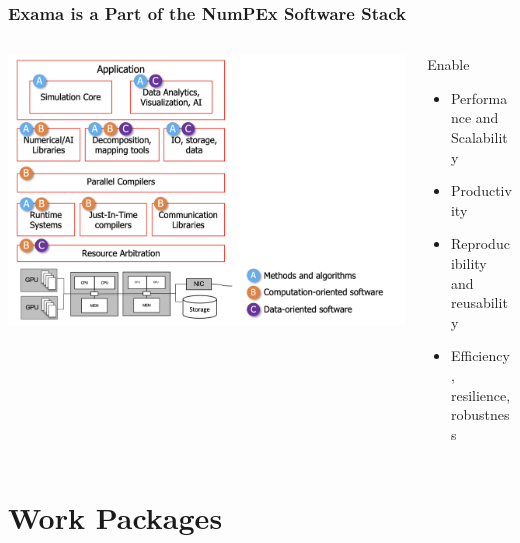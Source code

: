 \begin{frame}
  \frametitle{Exama is a Part of the NumPEx Software Stack}

  \begin{columns}[]
    \begin{column}{.5\linewidth}
      \begin{center}
        \includegraphics[height=.8\textheight]{../../figures/software-stack.png}  
      \end{center}
    \end{column}
    \begin{column}{.5\linewidth}
      Enable
      \begin{itemize}
        \item Performance and Scalability
        \item Productivity
        \item Reproducibility and reusability
        \item Efficiency, resilience, robustness
      \end{itemize}
    \end{column}
  \end{columns}
  
  
\end{frame}
\section{Work Packages}
